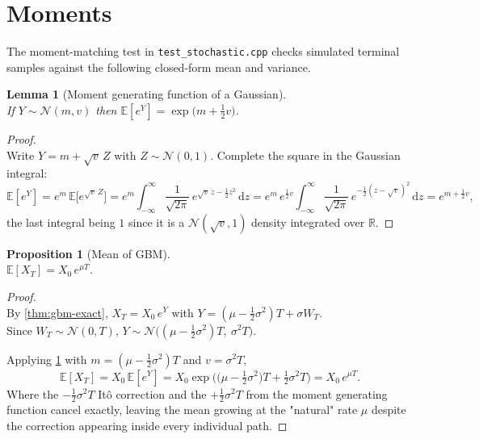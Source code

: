 \documentclass[11pt]{report}
\newcommand{\E}{\mathbb{E}}
\newcommand{\dd}{\mathrm{d}}
\newcommand{\R}{\mathbb{R}}
\theoremstyle{plain}
\newtheorem{lemma}{Lemma}[chapter]
\newtheorem{proposition}{Proposition}[chapter]
\theoremstyle{definition}
\theoremstyle{remark}
\numberwithin{equation}{chapter}
\begin{document}
\section{Moments}

The moment-matching test in \texttt{test\_stochastic.cpp} checks
simulated terminal samples against the following closed-form mean and
variance.

\begin{lemma}[Moment generating function of a Gaussian]\label{lem:mgf}
\leavevmode\\
If $Y\sim\mathcal N(m,v)$ then $\E[e^Y]=\exp\!\big(m+\tfrac12 v\big)$.
\end{lemma}


\begin{proof}
\leavevmode\\
Write $Y=m+\sqrt v\,Z$ with $Z\sim\mathcal N(0,1)$. Complete the square
in the Gaussian integral:
\[
   \E[e^Y] = e^m\,\E\big[e^{\sqrt v\,Z}\big]
           = e^m \int_{-\infty}^{\infty}
               \frac{1}{\sqrt{2\pi}}\,e^{\sqrt v\,z-\frac12 z^2}\,\dd z
           = e^m\,e^{\frac12 v}
             \int_{-\infty}^{\infty}
               \frac{1}{\sqrt{2\pi}}\,e^{-\frac12(z-\sqrt v)^2}\,\dd z
           = e^{m+\frac12 v},
\]
the last integral being $1$ since it is a $\mathcal N(\sqrt v,1)$
density integrated over $\R$.
\end{proof}

\begin{proposition}[Mean of GBM]\label{prop:gbm-mean}
\leavevmode\\
$\E[X_T] = X_0\,e^{\mu T}$.
\end{proposition}

\begin{proof}
\leavevmode\\
By \cref{thm:gbm-exact}, $X_T=X_0\,e^Y$ with
$Y=(\mu-\tfrac12\sigma^2)T+\sigma W_T$.
\\
Since $W_T\sim\mathcal N(0,T)$,
$Y\sim\mathcal N\big((\mu-\tfrac12\sigma^2)T,\ \sigma^2 T\big)$.

\noindent Applying
\cref{lem:mgf} with $m=(\mu-\tfrac12\sigma^2)T$ and $v=\sigma^2 T$,
\[
   \E[X_T] = X_0\,\E[e^Y]
           = X_0\exp\!\Big( \big(\mu-\tfrac12\sigma^2\big)T + \tfrac12\sigma^2 T \Big)
           = X_0\,e^{\mu T}.
\]
Where the $-\tfrac12\sigma^2 T$ It\^o correction and the $+\tfrac12\sigma^2 T$
from the moment generating function cancel exactly, leaving the mean
growing at the "natural" rate $\mu$ despite the correction appearing
inside every individual path.
\end{proof}
\end{document}
